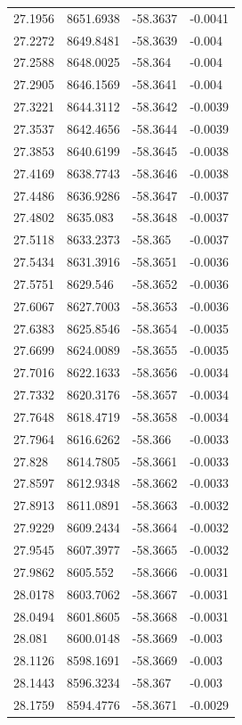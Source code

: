 \begin{table}[H]
\begin{tabular}{llll}
27.1956 & 8651.6938 & -58.3637 & -0.0041 \\
27.2272 & 8649.8481 & -58.3639 & -0.004 \\
27.2588 & 8648.0025 & -58.364 & -0.004 \\
27.2905 & 8646.1569 & -58.3641 & -0.004 \\
27.3221 & 8644.3112 & -58.3642 & -0.0039 \\
27.3537 & 8642.4656 & -58.3644 & -0.0039 \\
27.3853 & 8640.6199 & -58.3645 & -0.0038 \\
27.4169 & 8638.7743 & -58.3646 & -0.0038 \\
27.4486 & 8636.9286 & -58.3647 & -0.0037 \\
27.4802 & 8635.083 & -58.3648 & -0.0037 \\
27.5118 & 8633.2373 & -58.365 & -0.0037 \\
27.5434 & 8631.3916 & -58.3651 & -0.0036 \\
27.5751 & 8629.546 & -58.3652 & -0.0036 \\
27.6067 & 8627.7003 & -58.3653 & -0.0036 \\
27.6383 & 8625.8546 & -58.3654 & -0.0035 \\
27.6699 & 8624.0089 & -58.3655 & -0.0035 \\
27.7016 & 8622.1633 & -58.3656 & -0.0034 \\
27.7332 & 8620.3176 & -58.3657 & -0.0034 \\
27.7648 & 8618.4719 & -58.3658 & -0.0034 \\
27.7964 & 8616.6262 & -58.366 & -0.0033 \\
27.828 & 8614.7805 & -58.3661 & -0.0033 \\
27.8597 & 8612.9348 & -58.3662 & -0.0033 \\
27.8913 & 8611.0891 & -58.3663 & -0.0032 \\
27.9229 & 8609.2434 & -58.3664 & -0.0032 \\
27.9545 & 8607.3977 & -58.3665 & -0.0032 \\
27.9862 & 8605.552 & -58.3666 & -0.0031 \\
28.0178 & 8603.7062 & -58.3667 & -0.0031 \\
28.0494 & 8601.8605 & -58.3668 & -0.0031 \\
28.081 & 8600.0148 & -58.3669 & -0.003 \\
28.1126 & 8598.1691 & -58.3669 & -0.003 \\
28.1443 & 8596.3234 & -58.367 & -0.003 \\
28.1759 & 8594.4776 & -58.3671 & -0.0029 \\

\end{tabular}
\end{table}
